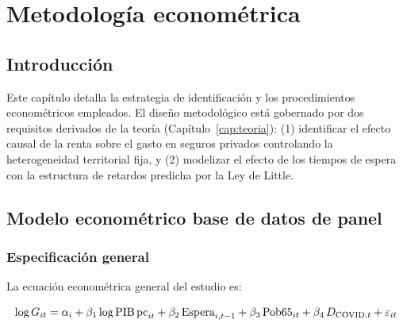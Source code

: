 \chapter{Metodología econométrica}
\label{cap:metodologia}

\section{Introducción}

Este capítulo detalla la estrategia de identificación y los procedimientos
econométricos empleados. El diseño metodológico está gobernado por dos requisitos
derivados de la teoría (Capítulo~\ref{cap:teoria}): (1) identificar el efecto
causal de la renta sobre el gasto en seguros privados controlando la heterogeneidad
territorial fija, y (2) modelizar el efecto de los tiempos de espera con la
estructura de retardos predicha por la Ley de Little.

\section{Modelo econométrico base de datos de panel}

\subsection{Especificación general}

La ecuación econométrica general del estudio es:

\begin{equation}
  \log G_{it} = \alpha_{i} + \beta_1 \log\text{PIB\,pc}_{it}
    + \beta_2 \, \text{Espera}_{i,t-1}
    + \beta_3 \, \text{Pob65}_{it}
    + \beta_4 \, D_{\text{COVID},t}
    + \varepsilon_{it}
  \label{eq:modelo_base}
\end{equation}

